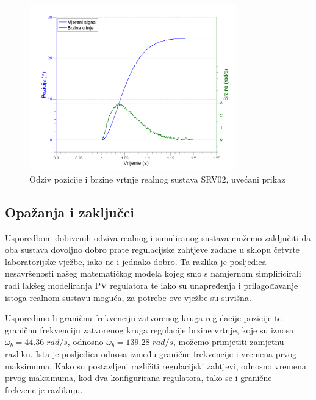 \documentclass[12pt,a4paper]{article}
\begin{document}
\begin{figure}[hb!]
	\begin{center}
	\includegraphics[width=0.8\textwidth] {spd_pos_close.png}
    \caption{Odziv pozicije i brzine vrtnje realnog sustava SRV02, uvećani prikaz}
    \end{center}
\end{figure}

\newpage

\subsection{Opažanja i zaključci}

Usporedbom dobivenih odziva realnog i simuliranog sustava možemo zaključiti da oba sustava dovoljno dobro prate regulacijske zahtjeve zadane u sklopu četvrte laboratorijske vježbe, iako ne i jednako dobro. Ta razlika je posljedica nesavršenosti našeg matematičkog modela kojeg smo s namjernom simplificirali radi lakšeg modeliranja PV regulatora te iako su unapređenja i prilagođavanje istoga realnom sustavu moguća, za potrebe ove vježbe su suvišna.

Usporedimo li graničnu frekvenciju zatvorenog kruga regulacije pozicije te graničnu frekvenciju zatvorenog kruga regulacije brzine vrtnje, koje su iznosa 
$\omega_b = 44.36 \;rad/s$, odnosno $\omega_b = 139.28 \; rad/s$, možemo primjetiti zamjetnu razliku. Ista je posljedica odnosa između granične frekvencije i vremena prvog maksimuma. Kako su postavljeni različiti regulacijski zahtjevi, odnosno vremena prvog maksimuma, kod dva konfigurirana regulatora, tako se i granične frekvencije razlikuju.
\end{document}
